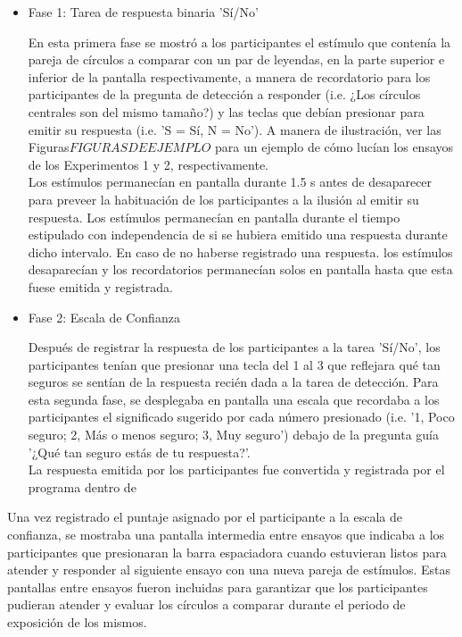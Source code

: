 \begin{itemize}
\item Fase 1: Tarea de respuesta binaria 'Sí/No'

En esta primera fase se mostró a los participantes el estímulo que contenía la pareja de círculos a comparar con un par de leyendas, en la parte superior e inferior de la pantalla respectivamente, a manera de recordatorio para los participantes de la pregunta de detección a responder (i.e. ¿Los círculos centrales son del mismo tamaño?) y las teclas que debían presionar para emitir su respuesta (i.e. 'S = Sí, N = No'). A manera de ilustración, ver las Figuras$FIGURAS DE EJEMPLO$ para un ejemplo de cómo lucían los ensayos de los Experimentos 1 y 2, respectivamente.\\

Los estímulos permanecían en pantalla durante 1.5 s antes de desaparecer para preveer la habituación de los participantes a la ilusión al emitir su respuesta. Los estímulos permanecían en pantalla durante el tiempo estipulado con independencia de si se hubiera emitido una respuesta durante dicho intervalo. En caso de no haberse registrado una respuesta. los estímulos desaparecían y los recordatorios permanecían solos en pantalla hasta que esta fuese emitida y registrada.\\

\item Fase 2: Escala de Confianza

Después de registrar la respuesta de los participantes a la tarea 'Sí/No', los participantes tenían que presionar una tecla del 1 al 3 que reflejara qué tan seguros se sentían de la respuesta recién dada a la tarea de detección. Para esta segunda fase, se desplegaba en pantalla una escala que recordaba a los participantes el significado sugerido por cada número presionado (i.e. '1, Poco seguro; 2, Más o menos seguro; 3, Muy seguro') debajo de la pregunta guía '¿Qué tan seguro estás de tu respuesta?'.\\

La respuesta emitida por los participantes fue convertida y registrada por el programa dentro de 

\end{itemize}

Una vez registrado el puntaje asignado por el participante a la escala de confianza, se mostraba una pantalla intermedia entre ensayos que indicaba a los participantes que presionaran la barra espaciadora cuando estuvieran listos para atender y responder al siguiente ensayo con una nueva pareja de estímulos. Estas pantallas entre ensayos fueron incluidas para garantizar que los participantes pudieran atender y evaluar los círculos a comparar durante el periodo de exposición de los mismos.\\

